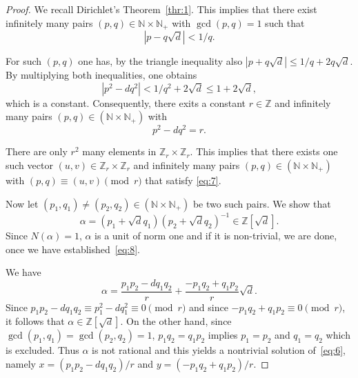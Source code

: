 \documentclass[a4paper,11pt,american]{article}
\theoremstyle{plain}
\theoremstyle{definition}
\begin{document}
\begin{proof}
  We recall Dirichlet's Theorem~\ref{thr:1}. This implies that there exist infinitely many pairs $(p,q) ∈ ℕ × ℕ_+$ with $\gcd(p,q) = 1$ such that 
   \begin{displaymath}
    | p - q \sqrt{d}  | < 1/q. 
  \end{displaymath}

  For such $(p,q)$ one has, by the triangle inequality also  $ | p +  q \sqrt{d}  | ≤ 1/q + 2 q \sqrt{d} $. By multiplying both inequalities, one obtains
  \begin{displaymath}
    | p^2 - d q^2 | <  1/q^2 + 2 \sqrt{d} ≤ 1 + 2 \sqrt{d},
  \end{displaymath}
  which is a constant. Consequently, there exits a constant $r ∈ ℤ$
  and infinitely many pairs $(p,q) ∈(ℕ × ℕ_+)$ with
  \begin{equation}
    \label{eq:7}    
    p^2 - d q^2  = r.
  \end{equation}

  There are only $r^2$ many elements in $ℤ_r × ℤ_r$. This implies that
  there exists one such vector $(u,v) ∈ ℤ_r × ℤ_r$ and infinitely many
  pairs $(p,q) ∈(ℕ × ℕ_+)$ with $(p,q) ≡ (u,v) \pmod{r}$ that satisfy
  \eqref{eq:7}.


  Now let   $(p_1,q_1) ≠  (p_2,q_2) ∈(ℕ × ℕ_+)$ be two such pairs. We show that
  \begin{equation}
    \label{eq:8}   
  α =  (p_1 + \sqrt{d} q_1 ) (p_2 + \sqrt{d} q_2)^{-1} ∈ ℤ[\sqrt{d}]. 
  \end{equation}
  Since $N(α) = 1$, $α$ is a unit of norm one and if it is non-trivial, we are done, once we have established~\eqref{eq:8}.

  We have
  \begin{displaymath}
    α = \frac{p_1 p_2 - d q_1 q_2}{r} + \frac{-p_1q_2 + q_1p_2}{r} \sqrt{d}.  
  \end{displaymath} 
  Since $p_1 p_2 - d q_1 q_2 ≡ p_1^2 - d q_1^2 ≡ 0\pmod{r}$ and since $-p_1q_2 + q_1p_2 ≡ 0 \pmod{r}$, it follows that $α ∈ℤ[\sqrt{d}]$.  On the other hand, since $\gcd(p_1,q_1) =\gcd(p_2,q_2)=1$,   $p_1q_2 = q_1p_2$ implies $p_1 = p_2$ and $q_1 = q_2$ which is excluded. Thus $α$ is not rational and this yields a nontrivial solution of~\eqref{eq:6}, namely $x = (p_1 p_2 - d q_1 q_2)/r$ and $y = (-p_1q_2 + q_1p_2)/{r}$. 
  


  
\end{proof}



\end{document}
